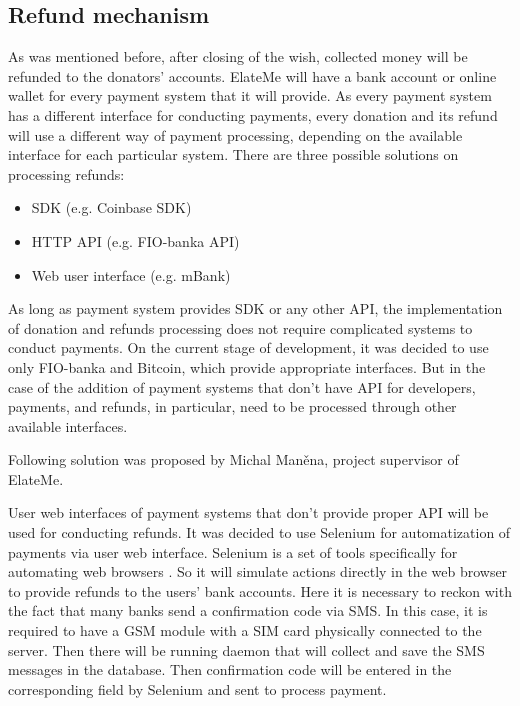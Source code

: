 \subsection{Refund mechanism}
As was mentioned before, after closing of the wish, collected money will be refunded to the donators' accounts. ElateMe will have a bank account or online wallet for every payment system that it will provide. As every payment system has a different interface for conducting payments, every donation and its refund will use a different way of payment processing, depending on the available interface for each particular system. There are three possible solutions on processing refunds:

\begin{itemize}
    \item \ac{SDK} (e.g. Coinbase \ac{SDK})
    \item \ac{HTTP} \ac{API} (e.g. FIO-banka \ac{API})
    \item Web user interface (e.g. mBank)
\end{itemize}

As long as payment system provides \ac{SDK} or any other \ac{API}, the implementation of donation and refunds processing does not require complicated systems to conduct payments. On the current stage of development, it was decided to use only FIO-banka and Bitcoin, which provide appropriate interfaces. But in the case of the addition of payment systems that don't have \ac{API} for developers, payments, and refunds, in particular, need to be processed through other available interfaces.

Following solution was proposed by Michal Maněna, project supervisor of ElateMe.

User web interfaces of payment systems that don't provide proper \ac{API} will be used for conducting refunds. It was decided to use Selenium for automatization of payments via user web interface. Selenium is a set of tools specifically for automating web browsers \cite{selenium}. So it will simulate actions directly in the web browser to provide refunds to the users' bank accounts. Here it is necessary to reckon with the fact that many banks send a confirmation code via SMS. In this case, it is required to have a \ac{GSM} module with a SIM card physically connected to the server. Then there will be running daemon that will collect and save the SMS messages in the database. Then confirmation code will be entered in the corresponding field by Selenium and sent to process payment.


